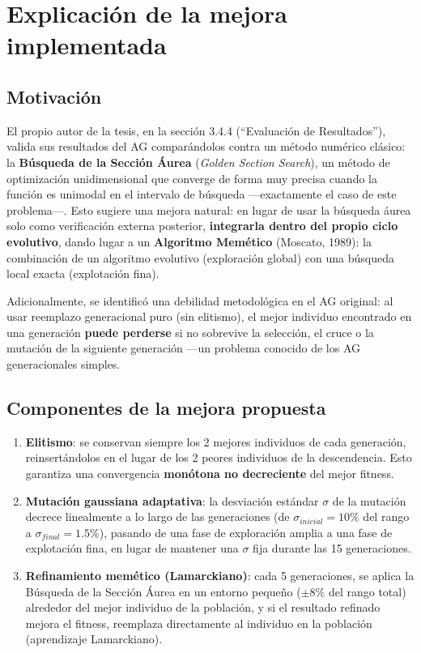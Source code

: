 \documentclass[11pt,a4paper]{article}
\begin{document}
\section{Explicación de la mejora implementada}

\subsection{Motivación}

El propio autor de la tesis, en la sección 3.4.4 (``Evaluación de
Resultados''), valida sus resultados del AG comparándolos contra un método
numérico clásico: la \textbf{Búsqueda de la Sección Áurea}
(\emph{Golden Section Search}), un método de optimización unidimensional que
converge de forma muy precisa cuando la función es unimodal en el intervalo
de búsqueda —exactamente el caso de este problema—. Esto sugiere una mejora
natural: en lugar de usar la búsqueda áurea solo como verificación externa
posterior, \textbf{integrarla dentro del propio ciclo evolutivo}, dando
lugar a un \textbf{Algoritmo Memético} (Moscato, 1989): la combinación de un
algoritmo evolutivo (exploración global) con una búsqueda local exacta
(explotación fina).

Adicionalmente, se identificó una debilidad metodológica en el AG original:
al usar reemplazo generacional puro (sin elitismo), el mejor individuo
encontrado en una generación \textbf{puede perderse} si no sobrevive la
selección, el cruce o la mutación de la siguiente generación —un problema
conocido de los AG generacionales simples.

\subsection{Componentes de la mejora propuesta}

\begin{enumerate}[nosep]
  \item \textbf{Elitismo}: se conservan siempre los 2 mejores individuos de
        cada generación, reinsertándolos en el lugar de los 2 peores
        individuos de la descendencia. Esto garantiza una convergencia
        \textbf{monótona no decreciente} del mejor fitness.
  \item \textbf{Mutación gaussiana adaptativa}: la desviación estándar
        $\sigma$ de la mutación decrece linealmente a lo largo de las
        generaciones (de $\sigma_{inicial}=10\%$ del rango a
        $\sigma_{final}=1.5\%$), pasando de una fase de exploración amplia a
        una fase de explotación fina, en lugar de mantener una $\sigma$ fija
        durante las 15 generaciones.
  \item \textbf{Refinamiento memético (Lamarckiano)}: cada 5 generaciones, se
        aplica la Búsqueda de la Sección Áurea en un entorno pequeño
        ($\pm 8\%$ del rango total) alrededor del mejor individuo de la
        población, y si el resultado refinado mejora el fitness, reemplaza
        directamente al individuo en la población (aprendizaje
        Lamarckiano).
\end{enumerate}
\end{document}

